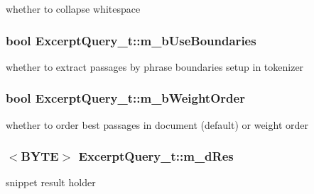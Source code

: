 whether to collapse whitespace 

\hypertarget{structExcerptQuery__t_a02cdd9a2a1cdc599d5404c7eb4285c8c}{
\subsubsection[{m\-\_\-b\-Use\-Boundaries}]{\setlength{\rightskip}{0pt plus 5cm}bool Excerpt\-Query\-\_\-t\-::m\-\_\-b\-Use\-Boundaries}}\label{structExcerptQuery__t_a02cdd9a2a1cdc599d5404c7eb4285c8c}


whether to extract passages by phrase boundaries setup in tokenizer 

\hypertarget{structExcerptQuery__t_abdb6014f9dac0330d735aef9c6329002}{
\subsubsection[{m\-\_\-b\-Weight\-Order}]{\setlength{\rightskip}{0pt plus 5cm}bool Excerpt\-Query\-\_\-t\-::m\-\_\-b\-Weight\-Order}}\label{structExcerptQuery__t_abdb6014f9dac0330d735aef9c6329002}


whether to order best passages in document (default) or weight order 

\hypertarget{structExcerptQuery__t_aa06a838e2c4cf401af30bebb81dfde9c}{
\subsubsection[{m\-\_\-d\-Res}]{$<${\bf B\-Y\-T\-E}$>$ Excerpt\-Query\-\_\-t\-::m\-\_\-d\-Res}}\label{structExcerptQuery__t_aa06a838e2c4cf401af30bebb81dfde9c}


snippet result holder 


